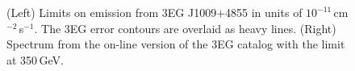 \begin{figure}[t]
\caption{\label{FIG::OBSERVATIONS::J1009} (Left) Limits on 
emission from 3EG J1009$+$4855 in units of
$10^{-11}$\,cm$^{-2}$\,s$^{-1}$. The 3EG error contours are overlaid
as heavy lines. (Right) Spectrum from the on-line version of the 3EG
catalog with the limit at 350\,GeV.}
\end{figure}

